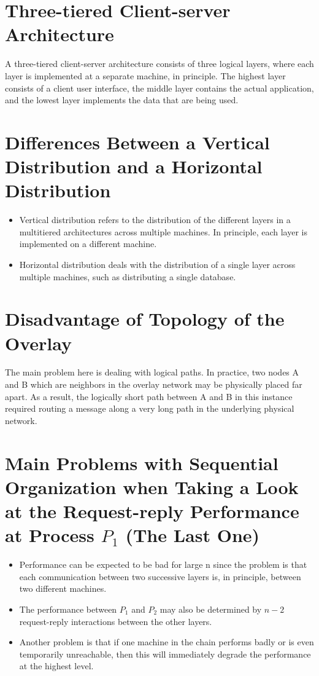 \documentclass[11pt,a4paper]{article}
\begin{document}
  	\section{Three-tiered Client-server Architecture}
  		A three-tiered client-server architecture consists of three logical layers, where each layer is implemented at a separate machine, in principle. The highest layer consists of a client user interface, the middle layer contains the actual application, and the lowest layer implements the data that are being used.
  	\section{Differences Between a Vertical Distribution and a Horizontal Distribution}
  		\begin{itemize}
  			\item Vertical distribution refers to the distribution of the different layers in a multitiered architectures across multiple machines. In principle, each layer is implemented on a different machine.
			\item Horizontal distribution deals with the distribution of a single layer across multiple machines, such as distributing a single database.
  		\end{itemize}
  	\section{Disadvantage of Topology of the Overlay}
  	The main problem here is dealing with logical paths. In practice, two nodes A and B which are neighbors in the overlay network may be physically placed far apart. As a result, the logically short path between A and B in this instance required routing a message along a very long path in the underlying physical network.
  	\section{Main Problems with Sequential Organization when Taking a Look at the Request-reply Performance at Process $P_1$ (The Last One)}
  		\begin{itemize}
  			\item Performance can be expected to be bad for large n since the problem is that each communication between two successive layers is, in principle, between two different machines.
  			\item The performance between $P_1$ and $P_2$
may also be determined by $n−2$ request-reply interactions between the other
layers.
			\item Another problem is that if one machine in the chain performs badly or is even temporarily unreachable, then this will immediately degrade the performance at the highest level.
  		\end{itemize}
\end{document}
